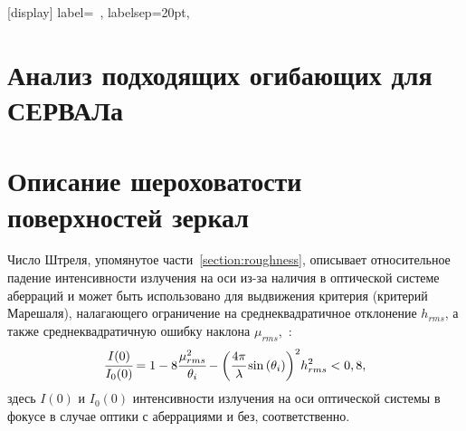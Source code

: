 \appendix
\sectionformat{\chapter}[display]{%
    label=\chaptertitlename\ \thechapter,%
    labelsep=20pt,
}
\renewcommand\thechapter{\Asbuk{chapter}} %
\chapter{Анализ подходящих огибающих для СЕРВАЛа} \label{AppendixA}
\chapter{Описание шероховатости поверхностей зеркал} \label{AppendixB}
Число Штреля, упомянутое части~\ref{section:roughness}, описывает относительное падение интенсивности излучения на оси из-за наличия в оптической системе аберраций и может быть использовано для выдвижения критерия (критерий Марешаля), налагающего ограничение на среднеквадратичное отклонение $h_{rms}$, а также среднеквадратичную ошибку наклона $\mu_{rms}$,~\cite{church_specification_1993}:
\begin{align}
	\cfrac{I(0)}{I_0(0)} = 1 - 8\cfrac{\mu^2_{rms}}{\theta_i} - \bigg(\cfrac{4 \pi}{\lambda} \sin{(\theta_i)} \bigg)^2 h^2_{rms} < 0,8,
	\label{eq:Marechal_criterion}
\end{align}
здесь $I(0)$ и $I_0(0)$ интенсивности излучения на оси оптической системы в фокусе в случае оптики с аберрациями и без, соответственно. 


